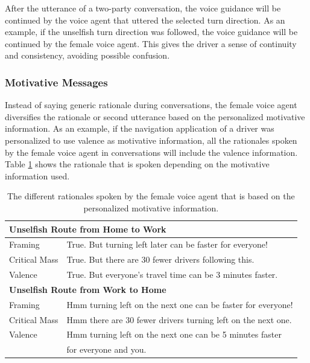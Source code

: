 After the utterance of a two-party conversation, the voice guidance will be continued by the voice agent that uttered the selected turn direction. As an example, if the unselfish turn direction was followed, the voice guidance will be continued by the female voice agent. This gives the driver a sense of continuity and consistency, avoiding possible confusion. 

\subsubsection{Motivative Messages}
Instead of saying generic rationale during conversations, the female voice agent diversifies the rationale or second utterance based on the personalized motivative information. As an example, if the navigation application of a driver was personalized to use valence as motivative information, all the rationales spoken by the female voice agent in conversations will include the valence information. Table \ref{tab:s4-motivativemessages} shows the rationale that is spoken depending on the motivative information used.

\begin{table}[ht]
	\centering
	\caption{The different rationales spoken by the female voice agent that is based on the personalized motivative information.}
	\begin{tabular}{l l}
		\toprule
		\multicolumn{2}{l}{\textbf{Unselfish Route from Home to Work}} \\
		\midrule
		Framing & True. But turning left later can be faster for everyone! \\
		Critical Mass & True. But there are 30 fewer drivers following this. \\
		Valence & True. But everyone's travel time can be 3 minutes faster. \\
		\toprule
		\multicolumn{2}{l}{\textbf{Unselfish Route from Work to Home}} \\
		\midrule
		Framing & Hmm turning left on the next one can be faster for everyone! \\
		Critical Mass & Hmm there are 30 fewer drivers turning left on the next one. \\
		Valence & Hmm turning left on the next one can be 5 minutes faster \\
		& for everyone and you. \\
		\bottomrule
	\end{tabular}
	\label{tab:s4-motivativemessages}
\end{table}


